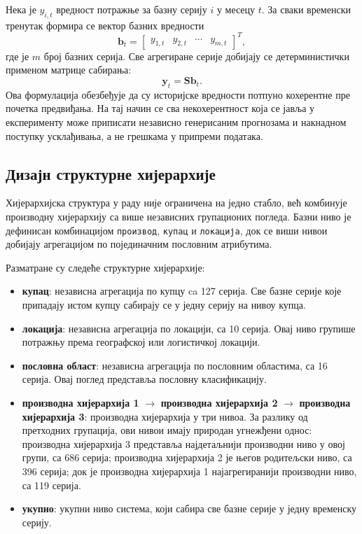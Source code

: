 \documentclass[12pt,oneside]{memoir}
\begin{document}
Нека је $y_{i,t}$ вредност потражње за базну серију $i$ у месецу $t$. За сваки временски тренутак формира се вектор базних вредности
\begin{equation}
    \mathbf{b}_t =
    \begin{bmatrix}
        y_{1,t} & y_{2,t} & \cdots & y_{m,t}
    \end{bmatrix}^{T},
\end{equation}
где је $m$ број базних серија. Све агрегиране серије добијају се детерминистички применом матрице сабирања:
\begin{equation}
    \mathbf{y}_t = \mathbf{S}\mathbf{b}_t.
\end{equation}
Ова формулација обезбеђује да су историјске вредности потпуно кохерентне пре почетка предвиђања. На тај начин се сва некохерентност која се јавља у експерименту може приписати независно генерисаним прогнозама и накнадном поступку усклађивања, а не грешкама у припреми података.

\subsection{Дизајн структурне хијерархије}

Хијерархијска структура у раду није ограничена на једно стабло, већ комбинује производну хијерархију са више независних групационих погледа. Базни ниво је дефинисан комбинацијом \texttt{производ}, \texttt{купац} и \texttt{локација}, док се виши нивои добијају агрегацијом по појединачним пословним атрибутима.

Разматране су следеће структурне хијерархије:
\begin{itemize}
    \item \textbf{купац}: независна агрегација по купцу ca 127 серија. Све базне серије које припадају истом купцу сабирају се у једну серију на нивоу купца.
    \item \textbf{локација}: независна агрегација по локацији, са 10 серија. Овај ниво групише потражњу према географској или логистичкој локацији.
    \item \textbf{пословна област}: независна агрегација по пословним областима, са 16 серија. Овај поглед представља пословну класификацију.
    \item \textbf{производна хијерархија 1} $\rightarrow$ \textbf{производна хијерархија 2} $\rightarrow$ \textbf{производна хијерархија 3}: производна хијерархија у три нивоа. За разлику од претходних групација, ови нивои имају природан угнежђени однос: производна хијерархија 3 представља најдетаљнији производни ниво у овој групи, са  686 серија; производна хијерархија 2 је његов родитељски ниво, са 396 серија; док је производна хијерархија 1 најагрегиранији производни ниво, са 119 серија.
    \item \textbf{укупно}: укупни ниво система, који сабира све базне серије у једну временску серију.
\end{itemize}
\end{document}
